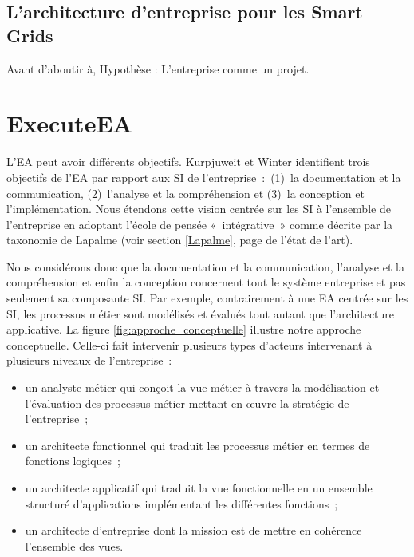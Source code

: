 	\subsection{L'architecture d'entreprise pour les Smart Grids}
	
	
Avant d'aboutir à, Hypothèse : L'entreprise comme un projet.


\section{ExecuteEA}


L'EA peut avoir différents objectifs. Kurpjuweit et Winter \cite{kurpjuweit2007viewpoint} identifient trois objectifs de l'EA par rapport aux SI de l'entreprise~:~(1)~la documentation et la communication, (2)~l'analyse et la compréhension et (3)~la conception et l'implémentation. Nous étendons cette vision centrée sur les SI à l'ensemble de l'entreprise en adoptant l'école de pensée «~intégrative~» comme décrite par la taxonomie de Lapalme (voir section \ref{Lapalme}, page \pageref{Lapalme} de l'état de l'art). 

Nous considérons donc que la documentation et la communication, l'analyse et la compréhension et enfin la conception concernent tout le système entreprise et pas seulement sa composante SI. Par exemple, contrairement à une EA centrée sur les SI, les processus métier sont modélisés et évalués tout autant que l'architecture applicative. La figure \ref{fig:approche_conceptuelle} illustre notre approche conceptuelle. Celle-ci fait intervenir plusieurs types d'acteurs intervenant à plusieurs niveaux de l'entreprise~:
\begin{itemize}
\item un analyste métier qui conçoit la vue métier à travers la modélisation et l'évaluation des processus métier mettant en œuvre la stratégie de l'entreprise~;
\item un architecte fonctionnel qui traduit les processus métier en termes de fonctions logiques~;
\item un architecte applicatif qui traduit la vue fonctionnelle en un ensemble structuré d'applications implémentant les différentes fonctions~;
\item un architecte d'entreprise dont la mission est de mettre en cohérence l'ensemble des vues.
\end{itemize}

